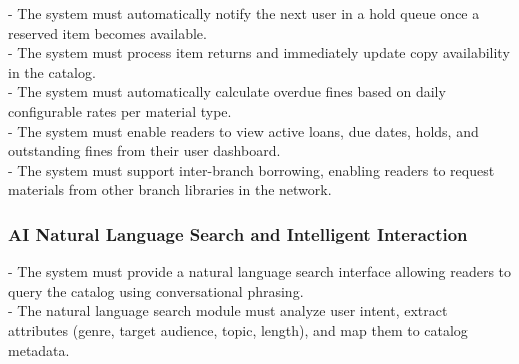 - The system must automatically notify the next user in a hold queue once a reserved item becomes available.\\

- The system must process item returns and immediately update copy availability in the catalog.\\

- The system must automatically calculate overdue fines based on daily configurable rates per material type.\\

- The system must enable readers to view active loans, due dates, holds, and outstanding fines from their user dashboard.\\

- The system must support inter-branch borrowing, enabling readers to request materials from other branch libraries in the network.\\











\subsubsection{AI Natural Language Search and Intelligent Interaction}

- The system must provide a natural language search interface allowing readers to query the catalog using conversational phrasing.\\

- The natural language search module must analyze user intent, extract attributes (genre, target audience, topic, length), and map them to catalog metadata.\\

